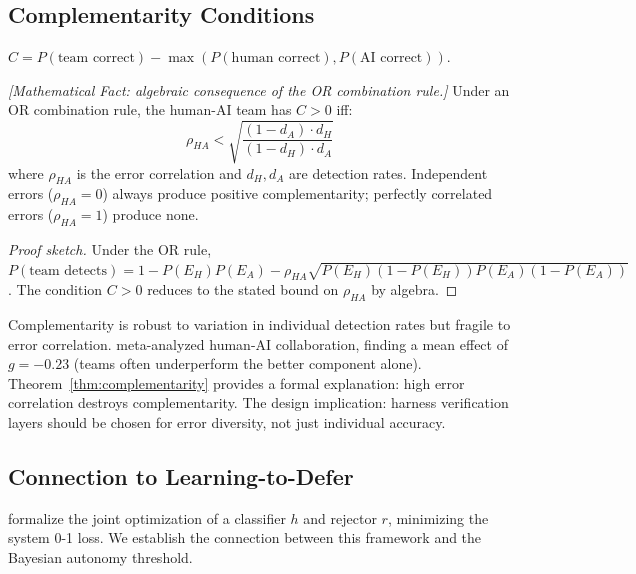 \subsection{Complementarity Conditions}

\begin{definition}
$C = P(\text{team correct}) - \max(P(\text{human correct}), P(\text{AI correct}))$.
\end{definition}

\begin{theorem}
\emph{[Mathematical Fact: algebraic consequence of the OR combination rule.]}
\label{thm:complementarity}
Under an OR combination rule, the human-AI team has $C > 0$ iff:
\begin{equation}
\rho_{HA} < \sqrt{\frac{(1 - d_A) \cdot d_H}{(1 - d_H) \cdot d_A}}
\end{equation}
where $\rho_{HA}$ is the error correlation and $d_H, d_A$ are detection rates. Independent errors ($\rho_{HA} = 0$) always produce positive complementarity; perfectly correlated errors ($\rho_{HA} = 1$) produce none.
\end{theorem}

\begin{proof}[Proof sketch]
Under the OR rule, $P(\text{team detects}) = 1 - P(E_H)P(E_A) - \rho_{HA}\sqrt{P(E_H)(1-P(E_H))P(E_A)(1-P(E_A))}$. The condition $C > 0$ reduces to the stated bound on $\rho_{HA}$ by algebra.
\end{proof}

Complementarity is robust to variation in individual detection rates but fragile to error correlation. \citet{vaccaro2024combinations} meta-analyzed human-AI collaboration, finding a mean effect of $g = -0.23$ (teams often underperform the better component alone). Theorem~\ref{thm:complementarity} provides a formal explanation: high error correlation destroys complementarity. The design implication: harness verification layers should be chosen for error diversity, not just individual accuracy.

\subsection{Connection to Learning-to-Defer}

\citet{mozannar2020consistent} formalize the joint optimization of a classifier $h$ and rejector $r$, minimizing the system 0-1 loss. We establish the connection between this framework and the Bayesian autonomy threshold.

